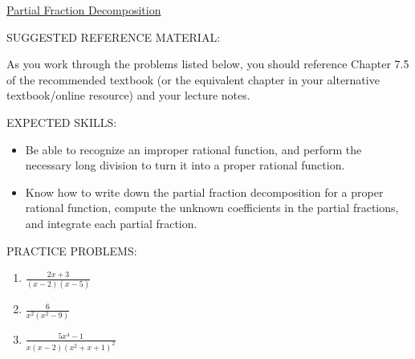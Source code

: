 \documentclass[12pt]{article}
\newif\ifans
\begin{document}
\begin{center}
\underline{\LARGE{Partial Fraction Decomposition}}
\end{center}

\noindent SUGGESTED REFERENCE MATERIAL:

\bigskip

\noindent As you work through the problems listed below, you should reference Chapter 7.5 of the recommended textbook (or the equivalent chapter in your alternative textbook/online resource) and your lecture notes.

\bigskip

\noindent EXPECTED SKILLS:

\begin{itemize}

\item Be able to recognize an improper rational function, and perform the necessary long division to turn it into a proper rational function. 

\item Know how to write down the partial fraction decomposition for a proper rational function, compute the unknown
coefficients in the partial fractions, and integrate each partial fraction.

\end{itemize}

\noindent PRACTICE PROBLEMS:

\medskip


\begin{enumerate}

\item $\frac{2x+3}{(x-2)(x-5)}$

\ifans{\fbox{$\frac{A}{x-2}+\frac{B}{x-5}$}} \fi

\item $\frac{6}{x^2(x^2-9)}$

\ifans{\fbox{$\frac{A}{x}+\frac{B}{x^2}+\frac{C}{x-3}+\frac{D}{x+3}$}} \fi

\item $\frac{5x^4-1}{x(x-2)(x^2+x+1)^2}$

\ifans{\fbox{$\frac{A}{x}+\frac{B}{x-2}+\frac{Cx+D}{x^2+x+1}+\frac{Ex+F}{(x^2+x+1)^2}$}} \fi

\end{enumerate}

\end{document}

